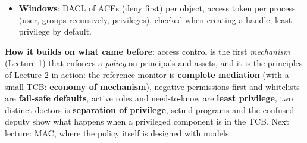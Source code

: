 \begin{recapbox}[title={Exam-ready recap --- Lecture 3: Access control basics and DAC}]
\begin{itemize}
        owner/group/other; on directories r = \texttt{ls}, w = create, x = \texttt{cd} (needed
        on \emph{every} directory of the path). \textbf{Only one class checked}: owner, else
        group, else other; root (UID 0, in the TCB) never denied. \texttt{suid/sgid}: run with
        the \emph{owner's} privileges (\texttt{passwd}; dangerous, in the TCB); sticky bit: only
        the owner deletes/renames in the directory (\texttt{/tmp}); nobody (UID $-2$): sandbox.
  \item \textbf{Windows}: DACL of ACEs (deny first) per object, access token per process (user,
        groups recursively, privileges), checked when creating a handle; least privilege by
        default.
\end{itemize}
\textbf{How it builds on what came before}: access control is the first \emph{mechanism} (Lecture
1) that enforces a \emph{policy} on principals and assets, and it is the principles of Lecture 2
in action: the reference monitor is \textbf{complete mediation} (with a small TCB:
\textbf{economy of mechanism}), negative permissions first and whitelists are \textbf{fail-safe
defaults}, active roles and need-to-know are \textbf{least privilege}, two distinct doctors is
\textbf{separation of privilege}, setuid programs and the confused deputy show what happens when
a privileged component is in the TCB. Next lecture: MAC, where the policy itself is designed with
models.
\end{recapbox}
